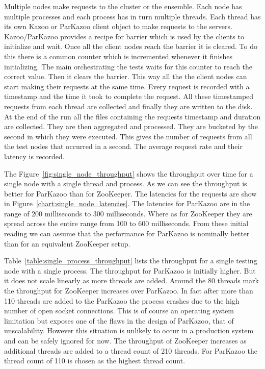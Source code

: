 Multiple nodes make requests to the cluster or the ensemble. Each node has multiple processes and each process has in turn multiple threads. Each thread has its own Kazoo or ParKazoo client object to make requests to the servers. Kazoo/ParKazoo provides a recipe for barrier which is used by the clients to initialize and wait. Once all the client nodes reach the barrier it is cleared. To do this there is a common counter which is incremented whenever it finishes initializing. The main orchestrating the tests waits for this counter to reach the correct value. Then it clears the barrier. This way all the the client nodes can start making their requests at the same time. Every request is recorded with a timestamp and the time it took to complete the request. All these timestamped requests from each thread are collected and finally they are written to the disk. At the end of the run all the files containing the requests timestamp and duration are collected. They are then aggregated and processed. They are bucketed by the second in which they were executed. This gives the number of requests from all the test nodes that occurred in a second. The average request rate and their latency is recorded. 





The Figure~\ref{fig:single_node_throughput} shows the throughput over time for a single node with a single thread and process. As we can see the throughput is better for ParKazoo than for ZooKeeper. The latencies for the requests are show in Figure~\ref{chart:single_node_latencies}. The latencies for ParKazoo are in the range of 200 milliseconds to 300 milliseconds. Where as for ZooKeeper they are spread across the entire range from 100 to 600 milliseconds. From these initial reading we can assume that the performance for ParKazoo is nominally better than for an equivalent ZooKeeper setup.



Table~\ref{table:single_process_throughput} lists the throughput for a single testing node with a single process. The throughput for ParKazoo is initially higher. But it does not scale linearly as more threads are added. Around the 80 threads mark the throughput for ZooKeeper increases over ParKazoo. In fact after more than 110 threads are added to the ParKazoo the process crashes due to the high number of open socket connections. This is of course an operating system limitation but exposes one of the flaws in the design of ParKazoo, that of unscalability. However this situation is unlikely to occur in a production system and can be safely ignored for now. The throughput of ZooKeeper increases as additional threads are added to a thread count of 210 threads. For ParKazoo the thread count of 110 is chosen as the highest thread count.

